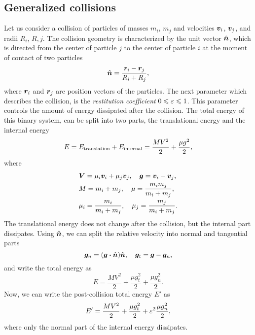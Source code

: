\documentclass[aps,prl,preprint,groupedaddress,10pt]{revtex4-2}
\begin{document}
\subsection{Generalized collisions}
Let us consider a collision of particles of masses $m_i$, $m_j$ and 
velocities $\vb*{v}_i$, $\vb*{v}_j$, and radii $R_i$, $R,j$. The collision geometry is 
characterized by the unit vector $\hat{\vb*{n}}$, which is directed from the center of particle 
$j$ to the center of particle $i$ at the moment of contact of two particles
\begin{equation}
    \hat{\vb*{n}}=\frac{\vb*{r}_i-\vb*{r}_j}{R_i+R_j},
\end{equation}
where $\vb*{r}_i$ and $\vb*{r}_j$ are position vectors of the particles. The next parameter 
which describes the collision, is the \emph{restitution coefficient} 
$0\leqslant\varepsilon\leqslant 1$. This parameter controls the amount of energy dissipated 
after the collision. The total energy of this binary system, can be split into two parts, 
the translational energy and the internal energy
\begin{equation}
    E=E_{\mathrm{translation}}+E_{\mathrm{internal}}=\frac{MV^2}{2}+\frac{\mu g^2}{2},
\end{equation}
where 
\begin{equation}
    \begin{split}
        &\vb*{V}=\mu_i\vb*{v}_i+\mu_j\vb*{v}_j,\quad\vb*{g}=\vb*{v}_i-\vb*{v}_j,\\
        &M=m_i+m_j,\quad\mu=\frac{m_im_j}{m_i+m_j},\\
        &\mu_i=\frac{m_i}{m_i+m_j},\quad\mu_j=\frac{m_j}{m_i+m_j}.
    \end{split}
\end{equation}
The translational energy does not change after the collision, but the internal part 
dissipates. Using $\hat{\vb*{n}}$, we can split the relative velocity into normal and tangential
parts
\begin{equation}
    \bg_n=\pqty{\bg\vdot\bn}\bn,\quad\bg_t=\bg-\bg_n,
\end{equation}
and write the total energy as 
\begin{equation}
    E=\frac{MV^2}{2}+\frac{\mu g_t^2}{2}+\frac{\mu g_n^2}{2}.
\end{equation}
Now, we can write the post-collision total energy $E'$ as 
\begin{equation}
    E'=\frac{MV^2}{2}+\frac{\mu g_t^2}{2}+\varepsilon^2\frac{\mu g_n^2}{2},
\end{equation}
where only the normal part of the internal energy dissipates.
\end{document}
